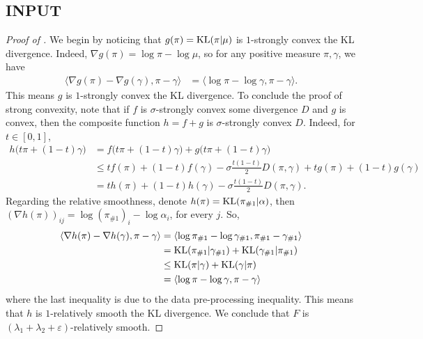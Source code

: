 \subsection{INPUT}
\begin{proof}[Proof of ]
We begin by noticing that $g(\pi) = \text{KL}(\pi | \mu)$ is $1$-strongly convex \wrt the KL divergence.
Indeed, $\nabla g(\pi) = \log \pi - \log \mu$, so for any positive measure $\pi, \gamma$, we have
\begin{align}
    \langle \nabla g(\pi) - \nabla g(\gamma), \pi - \gamma \rangle
    &= \langle
    \log \pi - \log \gamma, \pi - \gamma \rangle.
\end{align}
This means $g$ is $1$-strongly convex \wrt the KL divergence.
To conclude the proof of strong convexity, note that if $f$ is $\sigma$-strongly convex \wrt
some divergence $D$ and $g$ is convex, then the composite function $h = f + g$ is
$\sigma$-strongly convex \wrt $D$. Indeed, for $t \in [0,1]$,
\begin{align}
    h \big( t \pi + (1-t) \gamma \big)
    &= f \big( t \pi + (1-t) \gamma \big) + g \big( t \pi + (1-t) \gamma \big) \\
    &\leq t f(\pi) + (1 - t) f(\gamma) - \sigma \frac{t (1 - t)}{2} D(\pi, \gamma)
    + t g(\pi) + (1 - t) g(\gamma) \\
    &= t h(\pi) + (1 - t) h(\gamma) - \sigma \frac{t (1 - t)}{2} D(\pi, \gamma).
\end{align}
Regarding the relative smoothness, denote $h(\pi) = \text{KL}(\pi_{\#1} | \alpha)$,
then $(\nabla h(\pi))_{ij} = \log (\pi_{\#1})_i - \log \alpha_i$, for every $j$. So,
\begin{equation}
    \begin{split}
        \langle \nabla h(\pi) - \nabla h(\gamma), \pi - \gamma \rangle
    &= \langle
    \log \pi_{\# 1} - \log \gamma_{\# 1}, \pi_{\# 1} - \gamma_{\# 1} \rangle\\
    &= \text{KL}(\pi_{\# 1} | \gamma_{\# 1}) + \text{KL}(\gamma_{\# 1} | \pi_{\# 1}) \\
    &\leq \text{KL}(\pi | \gamma) + \text{KL}(\gamma | \pi) \\
    &= \langle \log \pi - \log \gamma, \pi - \gamma \rangle
    \end{split}
\end{equation}
where the last inequality is due to the data pre-processing inequality.
This means that $h$ is $1$-relatively smooth \wrt the KL divergence.
We conclude that $F$ is $(\lambda_1 + \lambda_2 + \varepsilon)$-relatively smooth.
\end{proof}


